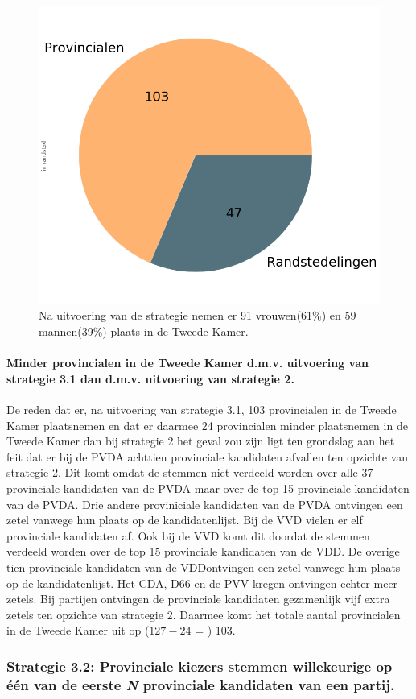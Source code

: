 \begin{figure}[H]
\centering
	\includegraphics[width=0.4\linewidth]{pie_chart_top15_of_topN_provincialen.png}

			\caption{Na uitvoering van de strategie nemen er 91 vrouwen(61\%) en 59 mannen(39\%) plaats in de Tweede Kamer.}

\label{fig:pcS31P}
\end{figure}

\paragraph{Minder provincialen in de Tweede Kamer d.m.v. uitvoering van strategie 3.1 dan d.m.v. uitvoering van strategie 2.}
De reden dat er, na uitvoering van strategie 3.1, 103 provincialen in de Tweede Kamer plaatsnemen en dat er daarmee 24 provincialen minder plaatsnemen in de Tweede Kamer dan bij strategie 2 het geval zou zijn ligt ten grondslag aan het feit dat er bij de PVDA achttien provinciale kandidaten afvallen ten opzichte van strategie 2. Dit komt omdat de stemmen niet verdeeld worden over alle 37 provinciale kandidaten van de PVDA maar over de top 15 provinciale kandidaten van de PVDA. Drie andere proviniciale kandidaten van de PVDA ontvingen een zetel vanwege hun plaats op de kandidatenlijst. Bij de VVD vielen er elf provinciale kandidaten af. Ook bij de VVD komt dit doordat de stemmen verdeeld worden over de top 15 provinciale kandidaten van de VDD. De overige tien provinciale kandidaten van de VDDontvingen een zetel vanwege hun plaats op de kandidatenlijst. Het CDA, D66 en de PVV kregen ontvingen echter meer zetels. Bij partijen ontvingen de provinciale kandidaten gezamenlijk vijf extra zetels ten opzichte van strategie 2. Daarmee komt het totale aantal provincialen in de Tweede Kamer uit op ($127-24$ = ) 103.



\subsubsection{Strategie 3.2: Provinciale kiezers stemmen willekeurige op één van de eerste \textit{N} provinciale kandidaten van een partij.}


